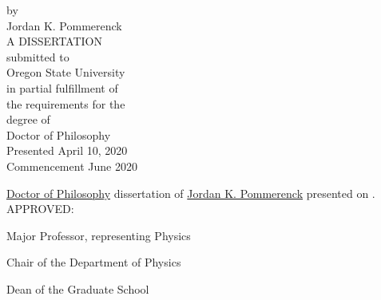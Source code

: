 \newpage{}
\thispagestyle{empty}
\singlespacing

\begin{center}

\vspace{1.0cm}
by \\
Jordan K. Pommerenck \\
\vspace{3.0cm}
A DISSERTATION \\
\vspace{0.5cm}
submitted to \\
\vspace{0.5cm}
Oregon State University \\
\vspace{3.0cm}
in partial fulfillment of \\
the requirements for the \\
degree of \\
\vspace{1.0cm}
Doctor of Philosophy \\
\vspace{3.0cm}
Presented April 10, 2020  \\
Commencement June 2020 
\end{center}

\newpage{}
\thispagestyle{empty}
\singlespacing
\justify{}
\underline{Doctor of Philosophy} dissertation of \underline{Jordan K. Pommerenck} presented on
. \\

\justify{}
\vspace{0.5cm}
APPROVED: \\

\justify{}
\underline{\hspace{15cm}}
\begin{flushleft}
Major Professor, representing Physics
\vspace{1.0cm}
\end{flushleft}

\justify{}
\underline{\hspace{15cm}}
\begin{flushleft}
Chair of the Department of Physics
\vspace{1.0cm}
\end{flushleft}

\justify{}
\underline{\hspace{15cm}}
\begin{flushleft}
Dean of the Graduate School
\vspace{1.0cm}
\end{flushleft}

